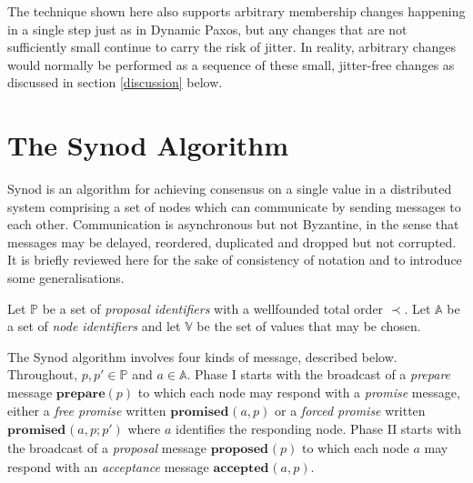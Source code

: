 \documentclass[journal]{IEEEtran}
\begin{document}
The technique shown here also supports arbitrary membership changes happening
in a single step just as in Dynamic Paxos, but any changes that are not
sufficiently small continue to carry the risk of jitter. In reality, arbitrary
changes would normally be performed as a sequence of these small, jitter-free
changes as discussed in section \ref{discussion} below.

\section{The Synod Algorithm}

Synod\cite{part-time-parliament} is an algorithm for achieving consensus on a
single value in a distributed system comprising a set of nodes which can
communicate by sending messages to each other. Communication is asynchronous
but not Byzantine, in the sense that messages may be delayed, reordered,
duplicated and dropped but not corrupted. It is briefly reviewed here for the
sake of consistency of notation and to introduce some generalisations.

Let $\mathbb P$ be a set of \textit{proposal identifiers} with a wellfounded
total order $\prec$. Let $\mathbb A$ be a set of \textit{node identifiers} and
let $\mathbb V$ be the set of values that may be chosen.

\def\prep#1{\mathbf{prepare}(#1)}
\def\mprom#1#2#3{\mathbf{promised}_{\ge #1}(#2,#3)}
\def\fprom#1#2#3{\mathbf{promised}_{#1}(#2,#3)}
\def\bprom#1#2#3#4{\mathbf{promised}_{#1}(#2,#3;#4)}
\def\prop#1#2{\mathbf{proposed}_{#1}(#2)}
\def\acc#1#2#3{\mathbf{accepted}_{#1}(#2,#3)}
\def\chosen#1#2{\mathbf{chosen}_{#1}(#2)}
\def\owner#1{\mathrm{owner}(#1)}

The Synod algorithm involves four kinds of message, described below.
Throughout, $p, p' \in \mathbb P$ and $a \in \mathbb A$.  Phase I starts with
the broadcast of a \textit{prepare} message $\prep{p}$ to which each node may
respond with a \textit{promise} message, either a \textit{free promise} written
$\fprom{}{a}{p}$ or a \textit{forced promise} written $\bprom{}{a}{p}{p'}$
where $a$ identifies the responding node.  Phase II starts with the broadcast
of a \textit{proposal} message $\prop{}{p}$ to which each node $a$ may respond
with an \textit{acceptance} message $\acc{}{a}{p}$.
\end{document}
